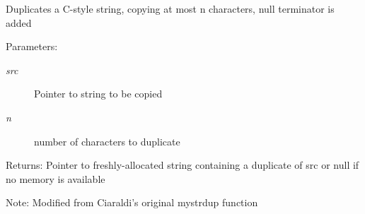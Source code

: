 Duplicates a C-style string, copying at most n characters, null terminator is added \begin{Desc}
\item[Parameters:]
\begin{description}
\item[{\em src}]Pointer to string to be copied \item[{\em n}]number of characters to duplicate \end{description}
\end{Desc}
\begin{Desc}
\item[Returns:]Pointer to freshly-allocated string containing a duplicate of src or null if no memory is available \end{Desc}
\begin{Desc}
\item[Note:]Modified from Ciaraldi's original mystrdup function \end{Desc}
